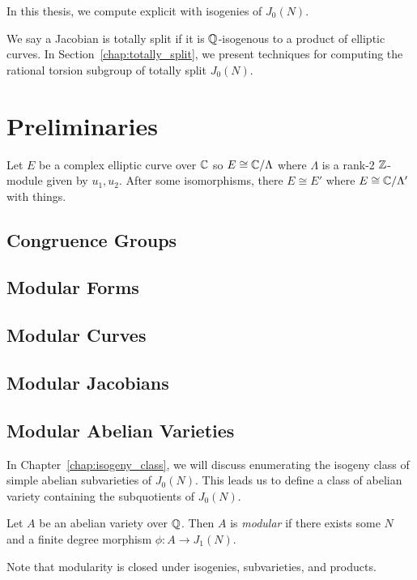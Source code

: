 \documentclass[11pt, proquest]{uwthesis}
\begin{document}
In this thesis, we compute explicit with isogenies of $J_0(N)$. 

We say a Jacobian is totally split if it is $\mathbb{Q}$-isogenous to a product of
elliptic curves. In Section~\ref{chap:totally_split}, we present techniques for
computing the rational torsion subgroup of totally split $J_0(N)$.



\chapter{Preliminaries}%
\label{chap:prelim}

Let $E$ be a complex elliptic curve over $\mathbb{C}$ so $E\cong \mathbb{C}/\Lambda$ where
$\Lambda$ is a rank-2 $\mathbb{Z}$-module given by $u_1,u_2$. After some isomorphisms,
there $E\cong E'$ where $E\cong \mathbb{C}/\Lambda'$ with things.

\section{Congruence Groups}

\section{Modular Forms}

\section{Modular Curves}

\section{Modular Jacobians}

\section{Modular Abelian Varieties}

In Chapter~\ref{chap:isogeny_class}, we will discuss enumerating the isogeny
class of simple abelian subvarieties of $J_0(N)$. This leads us to define a
class of abelian variety containing the subquotients of $J_0(N)$.

\begin{definition}
    \label{defn:modabvar}
    Let $A$ be an abelian variety over $\mathbb{Q}$. Then $A$ is \emph{modular} if
    there exists some $N$ and a finite degree morphism $\phi:A\to J_1(N)$.

    Note that modularity is closed under isogenies, subvarieties, and products.
\end{definition}
\end{document}
